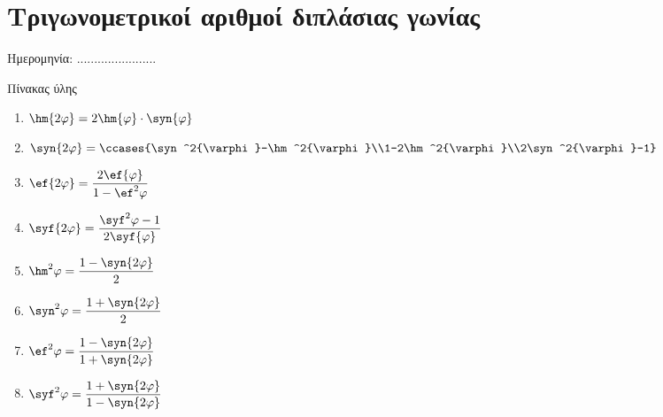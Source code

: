 \documentclass[twoside,nofonts,internet,math,spyros]{frontisthrio}
\newcommand{\myitem}{\stepcounter{enumi}\item[\raisebox{0.5mm}{\faExclamationTriangle}\ \Large$\square$]}
\begin{document}
\section{Τριγωνομετρικοί αριθμοί διπλάσιας γωνίας}
\begin{flushright}
\faCalendar* Ημερομηνία: .......................
\end{flushright}
\begin{mybox}[mysubtitle]{Πίνακας ύλης}
\begin{multicols}{2}
\begin{todolist}[itemsep=0mm]
\myitem 
\end{todolist}
\end{multicols}
\begin{multicols}{2}
\begin{enumerate}[itemsep=0mm]
\item $ \hm{2\varphi}=2\hm{\varphi}\cdot\syn{\varphi} $
\item $ \syn{2\varphi}=\ccases{\syn^2{\varphi}-\hm^2{\varphi}\\1-2\hm^2{\varphi}\\2\syn^2{\varphi}-1} $
\item $ \ef{2\varphi}=\dfrac{2\ef{\varphi}}{1-\ef^2{\varphi}}$
\item $ \syf{2\varphi}=\dfrac{\syf^2{\varphi}-1}{2\syf{\varphi}} $
\item $ \hm^2{\varphi}=\dfrac{1-\syn{2\varphi}}{2} $
\item $ \syn^2{\varphi}=\dfrac{1+\syn{2\varphi}}{2} $
\item $ \ef^2{\varphi}=\dfrac{1-\syn{2\varphi}}{1+\syn{2\varphi}} $
\item $ \syf^2{\varphi}=\dfrac{1+\syn{2\varphi}}{1-\syn{2\varphi}} $
\end{enumerate}
\end{multicols}
\end{mybox}
\newpage
\end{document}

